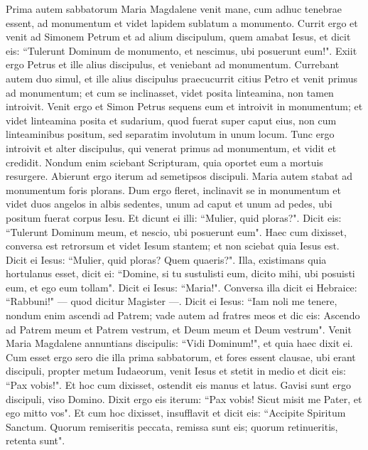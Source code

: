 \begin{biblechapter} 
\verse Prima autem sabbatorum Maria Magdalene venit mane, cum adhuc tenebrae essent, ad monumentum et videt lapidem sublatum a monumento. 
\verse Currit ergo et venit ad Simonem Petrum et ad alium discipulum, quem amabat Iesus, et dicit eis: “Tulerunt Dominum de monumento, et nescimus, ubi posuerunt eum!". 
\verse Exiit ergo Petrus et ille alius discipulus, et veniebant ad monumentum. 
\verse Currebant autem duo simul, et ille alius discipulus praecucurrit citius Petro et venit primus ad monumentum; 
\verse et cum se inclinasset, videt posita linteamina, non tamen introivit. 
\verse Venit ergo et Simon Petrus sequens eum et introivit in monumentum; et videt linteamina posita 
\verse et sudarium, quod fuerat super caput eius, non cum linteaminibus positum, sed separatim involutum in unum locum. 
\verse Tunc ergo introivit et alter discipulus, qui venerat primus ad monumentum, et vidit et credidit. 
\verse Nondum enim sciebant Scripturam, quia oportet eum a mortuis resurgere. 
\verse Abierunt ergo iterum ad semetipsos discipuli. 
\verse Maria autem stabat ad monumentum foris plorans. Dum ergo fleret, inclinavit se in monumentum 
\verse et videt duos angelos in albis sedentes, unum ad caput et unum ad pedes, ubi positum fuerat corpus Iesu. 
\verse Et dicunt ei illi: “Mulier, quid ploras?". Dicit eis: “Tulerunt Dominum meum, et nescio, ubi posuerunt eum". 
\verse Haec cum dixisset, conversa est retrorsum et videt Iesum stantem; et non sciebat quia Iesus est. 
\verse Dicit ei Iesus: “Mulier, quid ploras? Quem quaeris?". Illa, existimans quia hortulanus esset, dicit ei: “Domine, si tu sustulisti eum, dicito mihi, ubi posuisti eum, et ego eum tollam". 
\verse Dicit ei Iesus: “Maria!". Conversa illa dicit ei Hebraice: “Rabbuni!" — quod dicitur Magister —. 
\verse Dicit ei Iesus: “Iam noli me tenere, nondum enim ascendi ad Patrem; vade autem ad fratres meos et dic eis: Ascendo ad Patrem meum et Patrem vestrum, et Deum meum et Deum vestrum". 
\verse Venit Maria Magdalene annuntians discipulis: “Vidi Dominum!", et quia haec dixit ei. 
\verse Cum esset ergo sero die illa prima sabbatorum, et fores essent clausae, ubi erant discipuli, propter metum Iudaeorum, venit Iesus et stetit in medio et dicit eis: “Pax vobis!". 
\verse Et hoc cum dixisset, ostendit eis manus et latus. Gavisi sunt ergo discipuli, viso Domino. 
\verse Dixit ergo eis iterum: “Pax vobis! Sicut misit me Pater, et ego mitto vos". 
\verse Et cum hoc dixisset, insufflavit et dicit eis: “Accipite Spiritum Sanctum. 
\verse Quorum remiseritis peccata, remissa sunt eis; quorum retinueritis, retenta sunt". 

\end{biblechapter}
